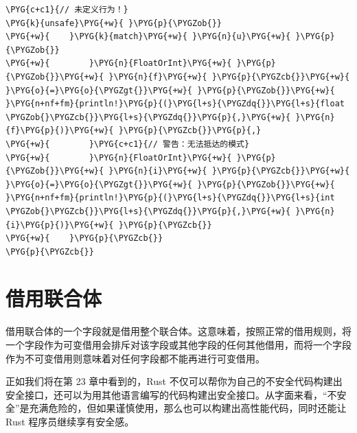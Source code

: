 \begin{Verbatim}[commandchars=\\\{\},breaklines=true,breakanywhere=true,fontsize=\codefont,xleftmargin=17bp]
\PYG{c+c1}{// 未定义行为！}
\PYG{k}{unsafe}\PYG{+w}{ }\PYG{p}{\PYGZob{}}
\PYG{+w}{    }\PYG{k}{match}\PYG{+w}{ }\PYG{n}{u}\PYG{+w}{ }\PYG{p}{\PYGZob{}}
\PYG{+w}{        }\PYG{n}{FloatOrInt}\PYG{+w}{ }\PYG{p}{\PYGZob{}}\PYG{+w}{ }\PYG{n}{f}\PYG{+w}{ }\PYG{p}{\PYGZcb{}}\PYG{+w}{ }\PYG{o}{=}\PYG{o}{\PYGZgt{}}\PYG{+w}{ }\PYG{p}{\PYGZob{}}\PYG{+w}{ }\PYG{n+nf+fm}{println!}\PYG{p}{(}\PYG{l+s}{\PYGZdq{}}\PYG{l+s}{float \PYGZob{}\PYGZcb{}}\PYG{l+s}{\PYGZdq{}}\PYG{p}{,}\PYG{+w}{ }\PYG{n}{f}\PYG{p}{)}\PYG{+w}{ }\PYG{p}{\PYGZcb{}}\PYG{p}{,}
\PYG{+w}{        }\PYG{c+c1}{// 警告：无法抵达的模式}
\PYG{+w}{        }\PYG{n}{FloatOrInt}\PYG{+w}{ }\PYG{p}{\PYGZob{}}\PYG{+w}{ }\PYG{n}{i}\PYG{+w}{ }\PYG{p}{\PYGZcb{}}\PYG{+w}{ }\PYG{o}{=}\PYG{o}{\PYGZgt{}}\PYG{+w}{ }\PYG{p}{\PYGZob{}}\PYG{+w}{ }\PYG{n+nf+fm}{println!}\PYG{p}{(}\PYG{l+s}{\PYGZdq{}}\PYG{l+s}{int \PYGZob{}\PYGZcb{}}\PYG{l+s}{\PYGZdq{}}\PYG{p}{,}\PYG{+w}{ }\PYG{n}{i}\PYG{p}{)}\PYG{+w}{ }\PYG{p}{\PYGZcb{}}
\PYG{+w}{    }\PYG{p}{\PYGZcb{}}
\PYG{p}{\PYGZcb{}}
\end{Verbatim}

\section{借用联合体}

借用联合体的一个字段就是借用整个联合体。这意味着，按照正常的借用规则，将一个字段作为可变借用会排斥对该字段或其他字段的任何其他借用，而将一个字段作为不可变借用则意味着对任何字段都不能再进行可变借用。

正如我们将在第 23 章中看到的，Rust 不仅可以帮你为自己的不安全代码构建出安全接口，还可以为用其他语言编写的代码构建出安全接口。从字面来看，“不安全”是充满危险的，但如果谨慎使用，那么也可以构建出高性能代码，同时还能让 Rust 程序员继续享有安全感。

